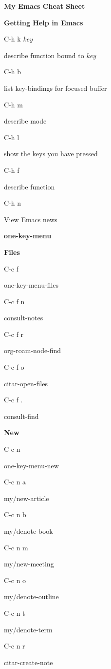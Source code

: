 \documentclass[10pt]{article}
\renewcommand\section[1]{\bigskip\par\textbf{\color{heading}\large#1}\smallskip}
\renewcommand\subsection[1]{\smallskip\par\textbf{\color{heading}#1}}
\newcommand\humanreadable[1]{{\par\color{default}\small\sffamily#1}}
\newcommand\meta[1]{\textlangle\textit{#1}\textrangle}
\begin{document}
\author{Jousimies}
\begin{multicols}{4}

  \setlength{\columnsep}{1cm}
  \begin{center}
    \LARGE\color{heading}\textbf{My Emacs Cheat Sheet}
  \end{center}

  \section{Getting Help in Emacs}
  \begin{keylist}
    \item[C-h k \meta{key}] \humanreadable{describe function bound to \meta{key}}
    \item[C-h b] \humanreadable{list key-bindings for focused buffer}
    \item[C-h m] \humanreadable{describe mode}
    \item[C-h l] \humanreadable{show the keys you have pressed}
    \item[C-h f] \humanreadable{describe function}
    \item[C-h n] \humanreadable{View Emacs news}
  \end{keylist}

  \section{one-key-menu}
  \subsection{Files}
  \begin{keylist}
    \item[C-c f] \humanreadable{one-key-menu-files}
    \item[C-c f n] \humanreadable{consult-notes}
    \item[C-c f r] \humanreadable{org-roam-node-find}
    \item[C-c f o] \humanreadable{citar-open-files}
    \item[C-c f .] \humanreadable{consult-find}
  \end{keylist}

  \subsection{New}
  \begin{keylist}
    \item[C-c n] \humanreadable{one-key-menu-new}
    \item[C-c n a] \humanreadable{my/new-article}
    \item[C-c n b] \humanreadable{my/denote-book}
    \item[C-c n m] \humanreadable{my/new-meeting}
    \item[C-c n o] \humanreadable{my/denote-outline}
    \item[C-c n t] \humanreadable{my/denote-term}
    \item[C-c n r] \humanreadable{citar-create-note}
  \end{keylist}


\end{multicols}
\end{document}
